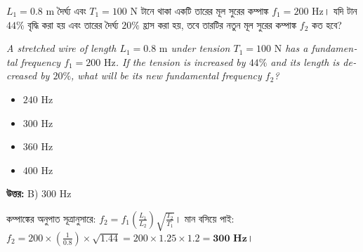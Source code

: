 \documentclass[12pt, a4paper]{article}
\begin{document}
\begin{tcolorbox}[questionbox={প্রশ্ন (Question) 12}]
    \noindent
    $L_1 = 0.8\text{ m}$ দৈর্ঘ্য এবং $T_1 = 100\text{ N}$ টানে থাকা একটি তারের মূল সুরের কম্পাঙ্ক $f_1 = 200\text{ Hz}$। যদি টান $44\%$ বৃদ্ধি করা হয় এবং তারের দৈর্ঘ্য $20\%$ হ্রাস করা হয়, তবে তারটির নতুন মূল সুরের কম্পাঙ্ক $f_2$ কত হবে?
    
    \vspace{0.8em}
    \begin{english}
    \noindent\textit{\color{darkgray}
    A stretched wire of length $L_1 = 0.8\text{ m}$ under tension $T_1 = 100\text{ N}$ has a fundamental frequency $f_1 = 200\text{ Hz}$. If the tension is increased by $44\%$ and its length is decreased by $20\%$, what will be its new fundamental frequency $f_2$?
    }
    \end{english}
\end{tcolorbox}

\begin{itemize}[label={}, leftmargin=1cm, itemsep=0.5em]
    \item[\textbf{A)}] $240\text{ Hz}$
    \item[\textbf{B)}] $300\text{ Hz}$
    \item[\textbf{C)}] $360\text{ Hz}$
    \item[\textbf{D)}] $400\text{ Hz}$
\end{itemize}

\vspace{0.5em}
\begin{tcolorbox}[answerbox]
    \textbf{\color{success} উত্তর:} B) $300\text{ Hz}$
\end{tcolorbox}
\vspace{1em}

\begin{tcolorbox}[solutionbox={সমাধান (Solution)}]
    \noindent
    কম্পাঙ্কের অনুপাত সূত্রানুসারে: $f_2 = f_1 \left(\frac{L_1}{L_2}\right) \sqrt{\frac{T_2}{T_1}}$। মান বসিয়ে পাই: $f_2 = 200 \times \left(\frac{1}{0.8}\right) \times \sqrt{1.44} = 200 \times 1.25 \times 1.2 = \mathbf{300\text{ Hz}}$।
\end{tcolorbox}

\vspace{2em}
\end{document}
